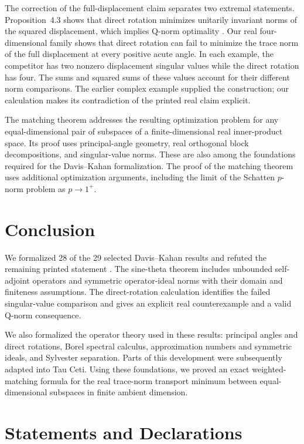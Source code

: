\documentclass[pdflatex]{sn-jnl} %
\theoremstyle{thmstyleone}
\begin{document}
The correction of the full-displacement claim
\citep[Proposition~4.4]{davis1970rotation} separates two extremal statements.
Proposition~4.3 shows that direct rotation minimizes unitarily invariant
norms of the squared displacement, which implies Q-norm optimality
\citep[Proposition~4.3]{davis1970rotation}. Our real four-dimensional family
shows that direct rotation can fail to minimize the trace norm of the full
displacement at every positive acute angle. In each example, the competitor has
two nonzero displacement singular values while the direct rotation has four.
The sums and squared sums of these values account for their different norm
comparisons. The earlier complex example supplied the construction; our
calculation makes its contradiction of the printed real claim explicit.

The matching theorem addresses the resulting optimization problem for any
equal-dimensional pair of subspaces of a finite-dimensional real inner-product
space. Its proof uses principal-angle geometry, real orthogonal block
decompositions, and
singular-value norms. These are also among the foundations required for the
Davis--Kahan formalization. The proof of the matching theorem uses additional
optimization arguments, including the limit of the Schatten $p$-norm
problem as $p\to1^+$.

\section{Conclusion}
\label{sec:conclusion}

We formalized 28 of the 29 selected Davis--Kahan results and refuted the
remaining printed statement \citep[Proposition~4.4]{davis1970rotation}.
The sine-theta theorem includes
unbounded self-adjoint operators and symmetric operator-ideal norms with
their domain and finiteness assumptions. The direct-rotation calculation
identifies the failed singular-value comparison and gives an explicit real
counterexample and a valid Q-norm consequence.

We also formalized the operator theory used in these results: principal
angles and direct rotations, Borel spectral calculus, approximation numbers
and symmetric ideals, and Sylvester separation. Parts of this development
were subsequently adapted into Tau Ceti. Using these foundations, we proved
an exact weighted-matching formula for the real trace-norm transport
minimum between equal-dimensional subspaces in finite ambient dimension.

\backmatter
\section*{Statements and Declarations}
\end{document}
